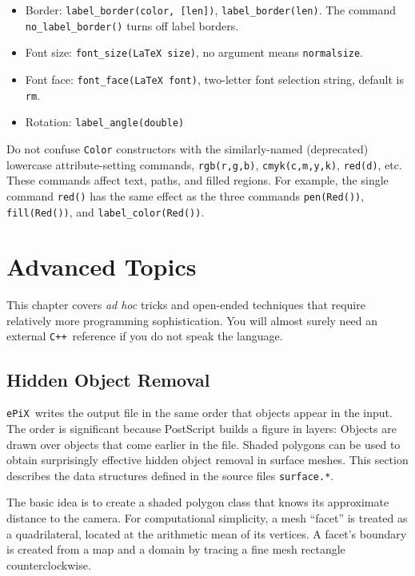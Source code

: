 \documentclass[12pt,letterpaper]{book}
\newcommand{\code}[1]{\texttt{#1}}
\newcommand{\ePiX}{\code{ePiX}}
\newcommand{\CXX}{\code{C++}}
\newcommand{\texinfochapter}[2]{\chapter{#2}}
\begin{document}
\begin{itemize}
\begin{itemize}
  \item Border: \code{label\_border(color, [len])},
    \code{label\_border(len)}. The command \code{no\_label\_border()}
    turns off label borders.

  \item Font size: \code{font\_size(LaTeX size)}, no argument means
    \code{normalsize}.

  \item Font face: \code{font\_face(LaTeX font)}, two-letter font
    selection string, default is \code{rm}.

  \item Rotation: \code{label\_angle(double)}

  \end{itemize}

\end{itemize}

Do not confuse \code{Color} constructors with the similarly-named
(deprecated) lowercase attribute-setting commands, \code{rgb(r,g,b)},
\code{cmyk(c,m,y,k)}, \code{red(d)}, etc. These commands affect text,
paths, and filled regions. For example, the single command
\code{red()} has the same effect as the three commands
\code{pen(Red())}, \code{fill(Red())}, and \code{label\_color(Red())}.


\texinfochapter{4}{Advanced Topics}
\label{chapter-adv}

This chapter covers \emph{ad hoc} tricks and open-ended techniques
that require relatively more programming sophistication. You will
almost surely need an external \CXX\ reference if you do not speak the
language.


\section{Hidden Object Removal}
\label{section-hidden}

\ePiX\ writes the output file in the same order that objects appear in
the input. The order is significant because PostScript builds a figure
in layers: Objects are drawn over objects that come earlier in the
file. Shaded polygons can be used to obtain surprisingly effective
hidden object removal in surface meshes. This section describes the
data structures defined in the source files \code{surface.*}.

The basic idea is to create a shaded polygon class that knows its
approximate distance to the camera. For computational simplicity, a
mesh ``facet'' is treated as a quadrilateral, located at the
arithmetic mean of its vertices. A facet's boundary is created from a
map and a domain by tracing a fine mesh rectangle counterclockwise.
\end{document}
